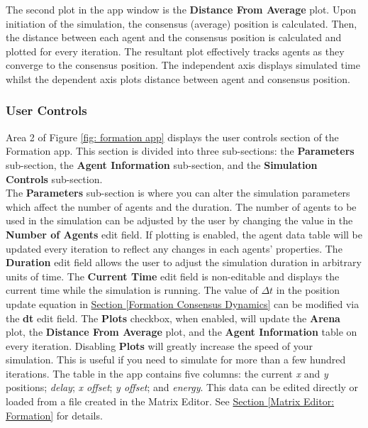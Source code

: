 \documentclass[../CourseManual.tex]{subfiles}
\begin{document}
The second plot in the app window is the \textbf{Distance From Average} plot. Upon initiation of the simulation, the consensus (average) position is calculated. Then, the distance between each agent and the consensus position is calculated and plotted for every iteration. The resultant plot effectively tracks agents as they converge to the consensus position. The independent axis displays simulated time whilst the dependent axis plots distance between agent and consensus position.
 
\subsubsection{User Controls} \label{User Controls: Formation}
Area 2 of Figure \ref{fig: formation app} displays the user controls section of the Formation app. This section is divided into three sub-sections: the \textbf{Parameters} sub-section, the \textbf{Agent Information} sub-section, and the \textbf{Simulation Controls} sub-section. \\

The \textbf{Parameters} sub-section  is where you can alter the simulation parameters which affect the number of agents and the duration. The number of agents to be used in the simulation can be adjusted by the user by changing the value in the \textbf{Number of Agents} edit field. If plotting is enabled, the agent data table will be updated every iteration to reflect any changes in each agents' properties. The \textbf{Duration} edit field allows the user to adjust the simulation duration in arbitrary units of time. The \textbf{Current Time} edit field is non-editable and displays the current time while the simulation is running. The value of $\Delta t$ in the position update equation in \hyperref[Formation Consensus Dynamics]{Section \ref{Formation Consensus Dynamics}} can be modified via the \textbf{dt} edit field. The \textbf{Plots} checkbox, when enabled, will update the \textbf{Arena} plot, the \textbf{Distance From Average} plot, and the \textbf{Agent Information} table on every iteration. Disabling \textbf{Plots} will greatly increase the speed of your simulation. This is useful if you need to simulate for more than a few hundred iterations. The table in the app contains five columns: the current \textit{x} and \textit{y} positions; \textit{delay}; \textit{x offset}; \textit{y offset}; and \textit{energy}. This data can be edited directly or loaded from a file created in the Matrix Editor. See \hyperref[Matrix Editor: Formation]{Section \ref{Matrix Editor: Formation}} for details.\\
\end{document}

